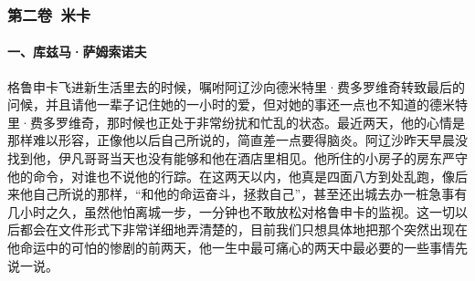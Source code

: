 \subsubsection*{第二卷\ 米卡}

\paragraph*{一、库兹马·萨姆索诺夫}
\par 格鲁申卡飞进新生活里去的时候，嘱咐阿辽沙向德米特里·费多罗维奇转致最后的问候，并且请他一辈子记住她的一小时的爱，但对她的事还一点也不知道的德米特里·费多罗维奇，那时候也正处于非常纷扰和忙乱的状态。最近两天，他的心情是那样难以形容，正像他以后自己所说的，简直差一点要得脑炎。阿辽沙昨天早晨没找到他，伊凡哥哥当天也没有能够和他在酒店里相见。他所住的小房子的房东严守他的命令，对谁也不说他的行踪。在这两天以内，他真是四面八方到处乱跑，像后来他自己所说的那样，“和他的命运奋斗，拯救自己”，甚至还出城去办一桩急事有几小时之久，虽然他怕离城一步，一分钟也不敢放松对格鲁申卡的监视。这一切以后都会在文件形式下非常详细地弄清楚的，目前我们只想具体地把那个突然出现在他命运中的可怕的惨剧的前两天，他一生中最可痛心的两天中最必要的一些事情先说一说。
